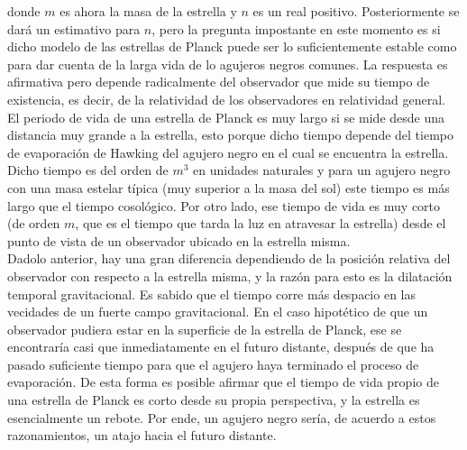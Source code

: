\documentclass{article}
\numberwithin{equation}{section}
\theoremstyle{definition}
\begin{document}
donde $m$ es ahora la masa de la estrella y $n$ es un real positivo. Posteriormente se dará un estimativo para $n$, pero la pregunta impostante en este momento es si dicho modelo de las estrellas de Planck puede ser lo suficientemente estable como para dar cuenta de la larga vida de lo agujeros negros comunes. La respuesta es afirmativa pero depende radicalmente del observador que mide su tiempo de existencia, es decir, de la relatividad de los observadores en relatividad general. El periodo de vida de una estrella de Planck es muy largo si se mide desde una distancia muy grande a la estrella, esto porque dicho tiempo depende del tiempo de evaporación de Hawking del agujero negro en el cual se encuentra la estrella. Dicho tiempo es del orden de $m^3$ en unidades naturales y para un agujero negro con una masa estelar típica (muy superior a la masa del sol) este tiempo es más largo que el tiempo cosológico. Por otro lado, ese tiempo de vida es muy corto (de orden $m$, que es el tiempo que tarda la luz en atravesar la estrella) desde el punto de vista de un observador ubicado en la estrella misma.\\

Dadolo anterior, hay una gran diferencia dependiendo de la posición relativa del observador con respecto a la estrella misma, y la razón para esto es la dilatación temporal gravitacional. Es sabido que el tiempo corre más despacio en las vecidades de un fuerte campo gravitacional. En el caso hipotético de que un observador pudiera estar en la superficie de la estrella de Planck, ese se encontraría casi que inmediatamente en el futuro distante, después de que ha pasado suficiente tiempo para que el agujero haya terminado el proceso de evaporación. De esta forma es posible afirmar que el tiempo de vida propio de una estrella de Planck es corto desde su propia perspectiva, y la estrella es esencialmente un rebote. Por ende, un agujero negro sería, de acuerdo a estos razonamientos, un atajo hacia el futuro distante.\\
\end{document}
